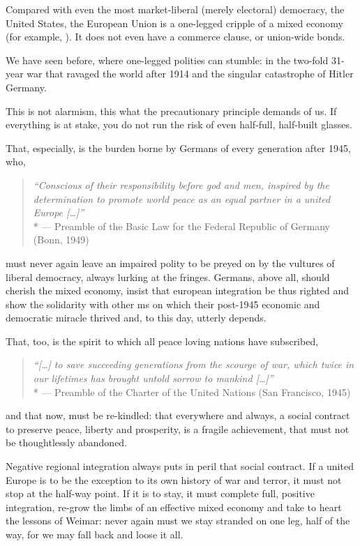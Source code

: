 Compared with even the most market-liberal (merely electoral) democracy, the United States, the European Union is a one-legged cripple of a mixed economy (for example, \citealt{Bordo2011}).
It does not even have a commerce clause, or union-wide bonds.

We have seen before, where one-legged polities can stumble:
in the two-fold 31-year war that ravaged the world after 1914 and the singular catastrophe of Hitler Germany.

This is not alarmism, this what the precautionary principle demands of us.
If everything is at stake, you do not run the risk of even half-full, half-built glasses.

That, especially, is the burden borne by Germans of every generation after 1945, who,
\begin{quote}
	\emph{``Conscious of their responsibility before god and men, inspired by the determination to promote world peace as an equal partner in a united Europe [\ldots]''}
	\\*
	--- Preamble of the Basic Law for the Federal Republic of Germany (Bonn, 1949)
\end{quote}
must never again leave an impaired polity to be preyed on by the vultures of liberal democracy, always lurking at the fringes.
Germans, above all, should cherish the mixed economy, insist that european integration be thus righted and show the solidarity with other \gls{ms} on which their post-1945 economic and democratic miracle thrived and, to this day, utterly depends.

That, too, is the spirit to which all peace loving nations have subscribed,
\begin{quote}
	\emph{``[\ldots] to save succeeding generations from the scourge of war, which twice in our lifetimes has brought untold sorrow to mankind [\ldots]''}
	\\*
	--- Preamble of the Charter of the United Nations (San Francisco, 1945)
\end{quote}
and that now, must be re-kindled:
that everywhere and always, a social contract to preserve peace, liberty and prosperity, is a fragile achievement, that must not be thoughtlessly abandoned.

Negative regional integration always puts in peril that social contract.
If a united Europe is to be the exception to its own history of war and terror, it must not stop at the half-way point.
If it is to stay, it must complete full, positive integration, re-grow the limbs of an effective mixed economy and take to heart the lessons of Weimar:
never again must we stay stranded on one leg, half of the way, for we may fall back and loose it all.

